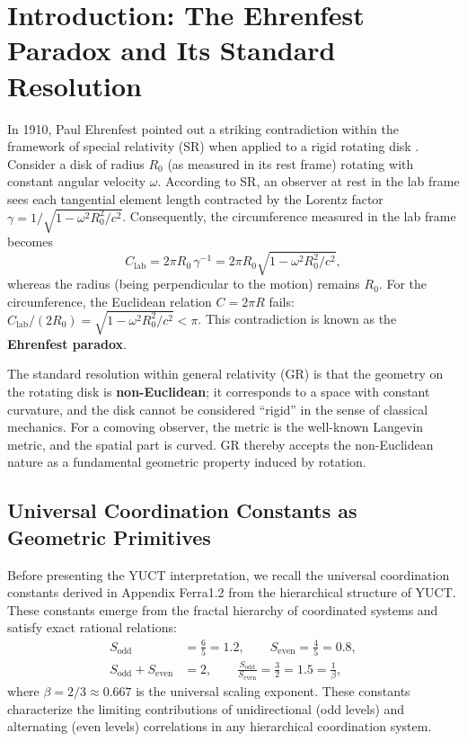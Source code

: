 \documentclass[12pt,a4paper]{article}
\newcommand{\betaf}{\beta}
\newcommand{\Sodd}{S_{\mathrm{odd}}}
\newcommand{\Seven}{S_{\mathrm{even}}}
\begin{document}
	\tableofcontents
	\newpage
	
	\section{Introduction: The Ehrenfest Paradox and Its Standard Resolution}
	\label{sec:intro}
	
	In 1910, Paul Ehrenfest pointed out a striking contradiction within the framework of special relativity (SR) when applied to a rigid rotating disk \cite{Ehrenfest1909}. Consider a disk of radius \(R_0\) (as measured in its rest frame) rotating with constant angular velocity \(\omega\). According to SR, an observer at rest in the lab frame sees each tangential element length contracted by the Lorentz factor \(\gamma = 1/\sqrt{1 - \omega^2 R_0^2/c^2}\). Consequently, the circumference measured in the lab frame becomes
	\[
	C_{\text{lab}} = 2\pi R_0 \, \gamma^{-1} = 2\pi R_0 \sqrt{1 - \omega^2 R_0^2/c^2},
	\]
	whereas the radius (being perpendicular to the motion) remains \(R_0\). For the circumference, the Euclidean relation \(C = 2\pi R\) fails: \(C_{\text{lab}}/(2R_0) = \sqrt{1 - \omega^2 R_0^2/c^2} < \pi\). This contradiction is known as the \textbf{Ehrenfest paradox}.
	
	The standard resolution within general relativity (GR) is that the geometry on the rotating disk is \textbf{non-Euclidean}; it corresponds to a space with constant curvature, and the disk cannot be considered ``rigid'' in the sense of classical mechanics. For a comoving observer, the metric is the well-known Langevin metric, and the spatial part is curved. GR thereby accepts the non-Euclidean nature as a fundamental geometric property induced by rotation.
	
	\subsection{Universal Coordination Constants as Geometric Primitives}
	
	Before presenting the YUCT interpretation, we recall the universal coordination constants derived in Appendix Ferra1.2 from the hierarchical structure of YUCT. These constants emerge from the fractal hierarchy of coordinated systems and satisfy exact rational relations:
	\begin{align}
		\Sodd &= \frac{6}{5} = 1.2, \qquad \Seven = \frac{4}{5} = 0.8, \\
		\Sodd + \Seven &= 2, \qquad \frac{\Sodd}{\Seven} = \frac{3}{2} = 1.5 = \frac{1}{\betaf},
	\end{align}
	where \(\betaf = 2/3 \approx 0.667\) is the universal scaling exponent. These constants characterize the limiting contributions of unidirectional (odd levels) and alternating (even levels) correlations in any hierarchical coordination system.
	
\end{document}

